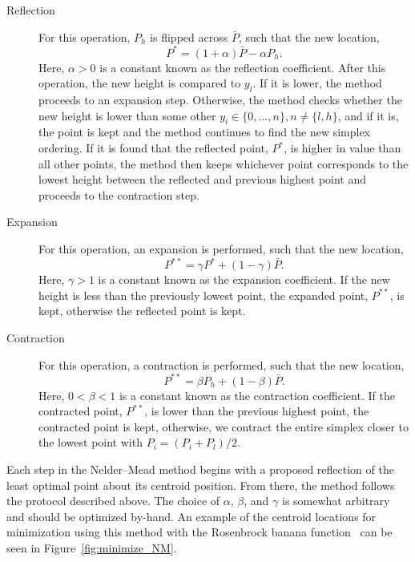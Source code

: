 \begin{description}

\item[Reflection] For this operation, $P_h$ is flipped across $\bar P$, such that the new location,
\begin{equation}
P^* = (1+\alpha)\bar P - \alpha P_h.
\end{equation}
\noindent Here, $\alpha > 0$ is a constant known as the reflection coefficient.
After this operation, the new height is compared to $y_l$.
If it is lower, the method proceeds to an expansion step.
Otherwise, the method checks whether the new height is lower than some other $y_i \in \{0,...,n\},n\neq \{l,h\}$, and if it is, the point is kept and the method continues to find the new simplex ordering.
If it is found that the reflected point, $P^*$, is higher in value than all other points, the method then keeps whichever point corresponds to the lowest height between the reflected and previous highest point and proceeds to the contraction step.

\item[Expansion] For this operation, an expansion is performed, such that the new location,
\begin{equation}
P^{**} = \gamma P^* + (1-\gamma)\bar P.
\end{equation}
\noindent Here, $\gamma > 1$ is a constant known as the expansion coefficient.
If the new height is less than the previously lowest point, the expanded point, $P^{**}$, is kept, otherwise the reflected point is kept.

\item[Contraction] For this operation, a contraction is performed, such that the new location,
\begin{equation}
P^{**} = \beta P_h + (1-\beta)\bar P.
\end{equation}
\noindent Here, $0 < \beta < 1$ is a constant known as the contraction coefficient.
If the contracted point, $P^{**}$, is lower than the previous highest point, the contracted point is kept, otherwise, we contract the entire simplex closer to the lowest point with $P_i = (P_i + P_l)/2$.
\end{description}

Each step in the Nelder--Mead method begins with a proposed reflection of the least optimal point about its centroid position.
From there, the method follows the protocol described above.
The choice of $\alpha$, $\beta$, and $\gamma$ is somewhat arbitrary and should be optimized by-hand.
An example of the centroid locations for minimization using this method with the Rosenbrock banana function~\cite{pohlheim2007} can be seen in Figure~\ref{fig:minimize_NM}.

